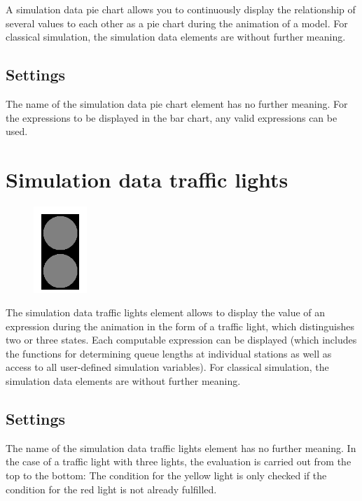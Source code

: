 A simulation data pie chart allows you to continuously display the relationship
of several values to each other as a pie chart during the animation of a model.
For classical simulation, the simulation data elements are without further meaning.

\subsection*{Settings}

The name of the simulation data pie chart element has no further meaning.
For the expressions to be displayed in the bar chart, any valid expressions can be used.


\section{Simulation data traffic lights}
\label{ref:ModelElementAnimationTrafficLights}

\begin{figure}
\vspace{-22pt}
\includegraphics[width=2cm]{imageModelElementAnimationTrafficLights.png}
\vspace{-22pt}
\end{figure}

The simulation data traffic lights element allows to display the value of an expression during the animation
in the form of a traffic light, which distinguishes two or three states. Each computable expression can be
displayed (which includes the functions for determining queue lengths at individual stations as well as
access to all user-defined simulation variables). For classical simulation, the simulation data elements
are without further meaning.

\subsection*{Settings}

The name of the simulation data traffic lights element has no further meaning.
In the case of a traffic light with three lights, the evaluation is carried out from the top to the bottom:
The condition for the yellow light is only checked if the condition for the red light is not already fulfilled.


